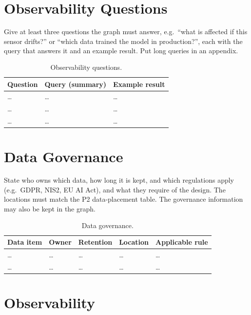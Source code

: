 \documentclass[report]{itvest}
\begin{document}
\section{Observability Questions}

Give at least three questions the graph must answer, e.g.\ ``what is
affected if this sensor drifts?'' or ``which data trained the model in
production?'', each with the query that answers it and an example result.
Put long queries in an appendix.

\begin{table}[h]
  \centering
  \begin{tabularx}{\textwidth}{XXX}
    \toprule
    Question & Query (summary) & Example result \\
    \midrule
    \ldots & \ldots & \ldots \\
    \ldots & \ldots & \ldots \\
    \ldots & \ldots & \ldots \\
    \bottomrule
  \end{tabularx}
  \caption{Observability questions.}
  \label{tab:questions}
\end{table}

\section{Data Governance}

State who owns which data, how long it is kept, and which regulations
apply (e.g.\ GDPR, NIS2, EU AI Act), and what they require of the design.
The locations must match the P2 data-placement table. The governance
information may also be kept in the graph.

\begin{table}[h]
  \centering
  \begin{tabularx}{\textwidth}{XlllX}
    \toprule
    Data item & Owner & Retention & Location & Applicable rule \\
    \midrule
    \ldots & \ldots & \ldots & \ldots & \ldots \\
    \ldots & \ldots & \ldots & \ldots & \ldots \\
    \bottomrule
  \end{tabularx}
  \caption{Data governance.}
  \label{tab:governance}
\end{table}

\section{Observability}
\end{document}
